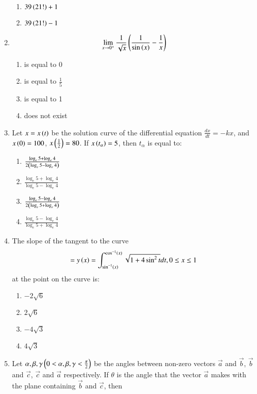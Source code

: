\documentclass[journal]{IEEEtran}
\begin{document}
\begin{enumerate}
\begin{enumerate}
     \item $39 \left(21!\right) + 1$
     \item $39 \left(21!\right) - 1$ \\
 \end{enumerate}
\item \begin{align*}
    \lim\limits_{x \rightarrow 0^{+}}\frac{1}{\sqrt{x}}\left(\frac{1}{\sin\left(x\right)} - \frac{1}{x}\right)
\end{align*}
\begin{enumerate}
    \item is equal to 0
    \item is equal to $\frac{1}{5}$
    \item is equal to 1
    \item does not exist \\
\end{enumerate}
\item  Let $x = x\left(t\right)$ be the solution curve of the differential equation $\frac{dx}{dt} = -kx$, and $x\left(0\right) = 100$, $x\left(\frac{1}{2}\right) = 80$. If $x\left(t_{\alpha}\right) = 5$, then $t_{\alpha}$ is equal to:
\begin{enumerate}
    \item $\frac{\log_{e}5 + \log_{e}4}{2\left(\log_{e}5 - \log_{e}4\right)}$
    \item $\frac{\log_{e}5 + \log_{e}4}{\log_{e}5 - \log_{e}4}$
    \item $\frac{\log_{e}5 - \log_{e}4}{2\left(\log_{e}5 + \log_{e}4\right)}$
    \item $\frac{\log_{e}5 - \log_{e}4}{\log_{e}5 + \log_{e}4}$ \\
\end{enumerate}
\item The slope of the tangent to the curve
\begin{align*}
   = y\left(x\right) = \int_{\sin^{-1}\left(x\right)}^{\cos^{-1}\left(x\right)}\sqrt{1 + 4\sin^2t}dt, 0 \leq x \leq 1
\end{align*}
at the point  on the curve is:
\begin{enumerate}
    \item $-2\sqrt{6}$
    \item $2\sqrt{6}$
    \item $-4\sqrt{3}$
    \item $4\sqrt{3}$\\
\end{enumerate}
 \item Let $\alpha, \beta, \gamma \left(0 < \alpha, \beta, \gamma < \frac{\pi}{2}\right)$ be the angles between non-zero vectors $\vec{a}$ and $\vec{b}$, $\vec{b}$ and $\vec{c}$, $\vec{c}$ and $\vec{a}$ respectively. If $\theta$ is the angle that the vector $\vec{a}$ makes with the plane containing $\vec{b}$ and $\vec{c}$, then

\end{enumerate}
\end{document}
